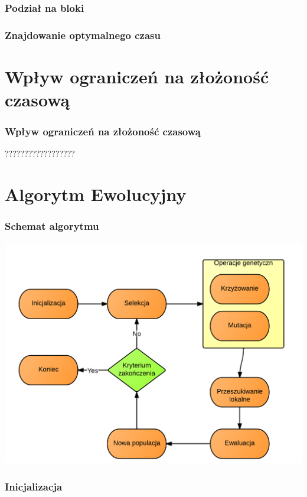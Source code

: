 \documentclass{beamer}
\begin{document}
\begin{frame}

\frametitle{Podział na bloki}

\end{frame}


\begin{frame}

\frametitle{Znajdowanie optymalnego czasu}

\end{frame}


\section{Wpływ ograniczeń na złożoność czasową}

\begin{frame}
 \frametitle{Wpływ ograniczeń na złożoność czasową}
 ??????????????????
\end{frame}


\section{Algorytm Ewolucyjny}

\begin{frame}
 \frametitle{Schemat algorytmu}
 \begin{center}
 \includegraphics[scale=0.18]{./Grafika/schemat.png}
\end{center}

\end{frame}

\begin{frame}
 \frametitle{Inicjalizacja}
 
 

\end{frame}
\end{document}
